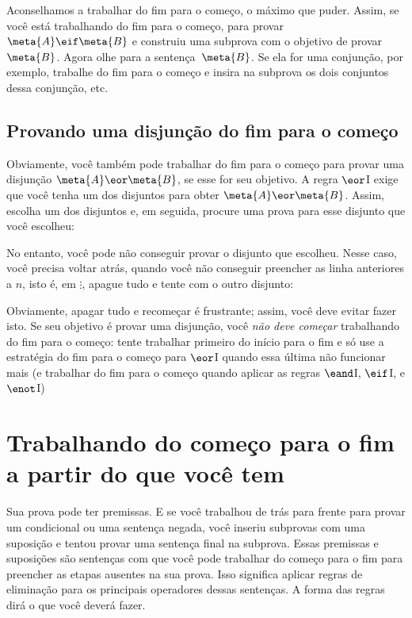 Aconselhamos a trabalhar do fim para o começo,  o máximo que puder. Assim, se você está trabalhando do fim para o começo, para provar $\meta{A} \eif \meta{B}$ e construiu uma subprova com o objetivo de  provar $\meta{B}$. Agora olhe para a sentença~$\meta{B}$. Se ela for uma conjunção, por exemplo, trabalhe do fim para o começo e insira na subprova os dois conjuntos dessa conjunção,  etc.


\subsection*{Provando uma disjunção do fim para o começo}

Obviamente, você também pode trabalhar do fim para o começo para provar  uma disjunção $\meta{A} \eor \meta{B}$, se esse for seu objetivo. A regra
 $\eor$I exige que você tenha um dos disjuntos para obter $\meta{A} \eor \meta{B}$.
 Assim, escolha um dos disjuntos e,  em seguida,  procure uma prova para esse  disjunto  que você escolheu:
\begin{fitchproof}
	\ellipsesline
\end{fitchproof}
 No entanto, você pode não conseguir provar o  disjunto que escolheu. Nesse caso, você precisa voltar atrás, quando você não conseguir preencher as linha anteriores a $n$, isto é, em $\vdots$, apague tudo e tente com o outro disjunto:
\begin{fitchproof}
	\ellipsesline 
\end{fitchproof}
 Obviamente, apagar tudo e recomeçar é frustrante;  assim, você deve evitar fazer isto. Se seu objetivo é  provar uma disjunção,  você \emph{não deve começar} trabalhando do fim para o começo: tente trabalhar primeiro do início para o fim e só use a estratégia  do fim para o começo para $\eor$I   quando essa última não funcionar mais (e trabalhar do fim para o começo quando aplicar as regras $\eand$I, $\eif$I, e $\enot$I) 


\section{Trabalhando do começo para o fim a partir do que você tem}

Sua prova pode ter premissas. E se você trabalhou de trás para frente para provar um condicional ou uma sentença negada, você inseriu subprovas com uma suposição e tentou provar uma sentença final na subprova. Essas premissas e suposições são sentenças com que você pode trabalhar do começo para o fim para preencher as etapas ausentes na sua prova. Isso significa aplicar regras de eliminação para os principais operadores dessas sentenças. A forma das regras dirá o que você deverá fazer.
 

